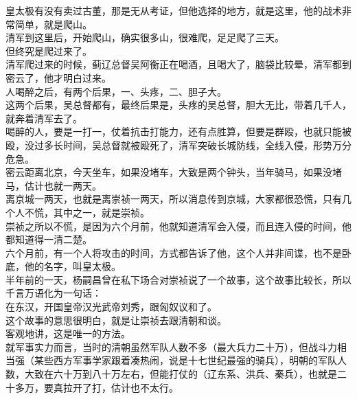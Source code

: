 \begin{multicols}{\theparacolNo}
皇太极有没有卖过古董，那是无从考证，但他选择的地方，就是这里，他的战术非常简单，就是爬山。\\

清军到这里后，开始爬山，确实很多山，很难爬，足足爬了三天。\\

但终究是爬过来了。\\

清军爬过来的时候，蓟辽总督吴阿衡正在喝酒，且喝大了，脑袋比较晕，清军都到密云了，他才明白过来。\\

人喝醉之后，有两个后果，一、头疼，二、胆子大。\\

这两个后果，吴总督都有，最终后果是，头疼的吴总督，胆大无比，带着几千人，就奔着清军去了。\\

喝醉的人，要是一打一，仗着抗击打能力，还有点胜算，但要是群殴，也就只能被殴，没过多长时间，吴总督就被殴死了，清军突破长城防线，全线入侵，形势万分危急。\\

密云距离北京，今天坐车，如果没堵车，大致是两个钟头，当年骑马，如果没堵马，估计也就一两天。\\

离京城一两天，也就是离崇祯一两天，所以消息传到京城，大家都很恐慌，只有几个人不慌，其中之一，就是崇祯。\\

崇祯之所以不慌，是因为六个月前，他就知道清军会入侵，而且连入侵的时间，他都知道得一清二楚。\\

六个月前，有一个人将攻击的时间，方式都告诉了他，这个人并非间谍，也不是卧底，他的名字，叫皇太极。\\

半年前的一天，杨嗣昌曾在私下场合对崇祯说了一个故事，这个故事比较长，所以千言万语化为一句话：\\

在东汉，开国皇帝汉光武帝刘秀，跟匈奴议和了。\\

这个故事的意思很明白，就是让崇祯去跟清朝和谈。\\

客观地讲，这是唯一的方法。\\

就军事实力而言，当时的清朝虽然军队人数不多（最大兵力二十万），但战斗力相当强（某些西方军事学家跟着凑热闹，说是十七世纪最强的骑兵），明朝的军队人数，大致在六十万到八十万左右，但能打仗的（辽东系、洪兵、秦兵），也就是二十多万，要真拉开了打，估计也不太行。\\


\end{multicols}

